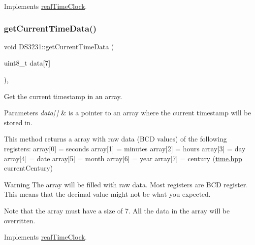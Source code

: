 Implements \mbox{\hyperlink{classreal_time_clock_a8fe956100fc4e339cd68ab413465f666}{real\+Time\+Clock}}.

\mbox{\label{class_d_s3231_a0ca41c2242367c5ff1424d1b12f909c5}} 
\subsubsection{\texorpdfstring{get\+Current\+Time\+Data()}{getCurrentTimeData()}}
{\footnotesize\ttfamily void D\+S3231\+::get\+Current\+Time\+Data (\begin{DoxyParamCaption}\item[{uint8\+\_\+t}]{data\mbox{[}7\mbox{]} }\end{DoxyParamCaption})\hspace{0.3cm}{\ttfamily [override]}, {\ttfamily [virtual]}}



Get the current timestamp in an array. 


\begin{DoxyParams}{Parameters}
{\em data\mbox{[}$\,$\mbox{]}} & is a pointer to an array where the current timestamp will be stored in.\\
\hline
\end{DoxyParams}
This method returns a array with raw data (B\+CD values) of the following registers\+: array\mbox{[}0\mbox{]} = seconds array\mbox{[}1\mbox{]} = minutes array\mbox{[}2\mbox{]} = hours array\mbox{[}3\mbox{]} = day array\mbox{[}4\mbox{]} = date array\mbox{[}5\mbox{]} = month array\mbox{[}6\mbox{]} = year array\mbox{[}7\mbox{]} = century (\mbox{\hyperlink{time_8hpp_source}{time.\+hpp}} current\+Century) \begin{DoxyWarning}{Warning}
The array will be filled with raw data. Most registers are B\+CD register. This means that the decimal value might not be what you expected. 

Note that the array must have a size of 7. All the data in the array will be overritten. 
\end{DoxyWarning}


Implements \mbox{\hyperlink{classreal_time_clock_a2d1613b3cd572f62bc9faaea6a0f82f2}{real\+Time\+Clock}}.

\mbox{\label{class_d_s3231_a04e087a918d2d48b0cdd2e3c6c2f595f}} 
